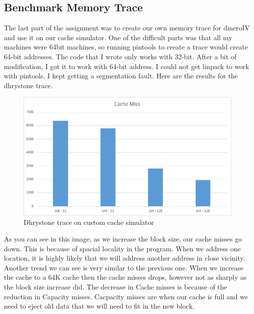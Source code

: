 \documentclass{article}
\begin{document}

	\subsection{Benchmark Memory Trace}
		The last part of the assignment was to create our own memory trace for dineroIV and use it on our cache simulator. One of the difficult parts was that all my machines were 64bit machines, so running pintools to create a trace would create 64-bit addresses. The code that I wrote only works with 32-bit. After a bit of modification, I got it to work with 64-bit address. I could not get linpack to work with pintools, I kept getting a segmentation fault. Here are the results for the dhrystone trace.
		\begin{figure}[H]
			\label{fig:custom_dry}
			\begin{center}
				\includegraphics[width=\textwidth]{custom_dry.png}
				\caption{Dhrystone trace on custom cache simulator}
			\end{center}
		\end{figure}
		As you can see in this image, as we increase the block size, our cache misses go down. This is because of spacial locality in the program. When we address one location, it is highly likely that we will address another address in close vicinity. Another trend we can see is very similar to the previous one. When we increase the cache to a 64K cache then the cache misses drops, however not as sharply as the block size increase did. The decrease in Cache misses is because of the reduction in Capacity misses. Cacpacity misses are when our cache is full and we need to eject old data that we will need to fit in the new block.
\end{document}
